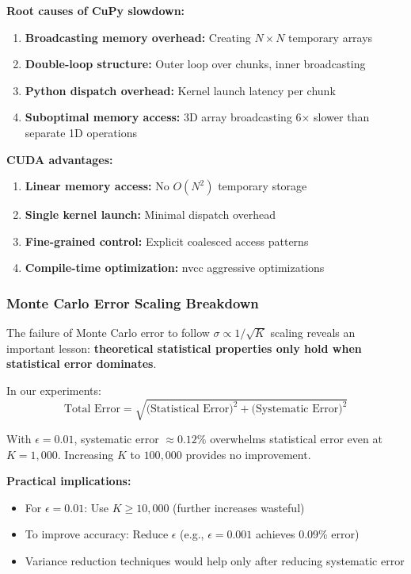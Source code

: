 \documentclass[11pt,a4paper]{article}
\begin{document}
\textbf{Root causes of CuPy slowdown:}
\begin{enumerate}
\item \textbf{Broadcasting memory overhead:} Creating $N \times N$ temporary arrays
\item \textbf{Double-loop structure:} Outer loop over chunks, inner broadcasting
\item \textbf{Python dispatch overhead:} Kernel launch latency per chunk
\item \textbf{Suboptimal memory access:} 3D array broadcasting 6× slower than separate 1D operations
\end{enumerate}

\textbf{CUDA advantages:}
\begin{enumerate}
\item \textbf{Linear memory access:} No $O(N^2)$ temporary storage
\item \textbf{Single kernel launch:} Minimal dispatch overhead
\item \textbf{Fine-grained control:} Explicit coalesced access patterns
\item \textbf{Compile-time optimization:} nvcc aggressive optimizations
\end{enumerate}

\subsubsection{Monte Carlo Error Scaling Breakdown}

The failure of Monte Carlo error to follow $\sigma \propto 1/\sqrt{K}$ scaling reveals an important lesson: \textbf{theoretical statistical properties only hold when statistical error dominates}.

In our experiments:
\begin{equation}
\text{Total Error} = \sqrt{\text{(Statistical Error)}^2 + \text{(Systematic Error)}^2}
\end{equation}

With $\epsilon=0.01$, systematic error $\approx 0.12\%$ overwhelms statistical error even at $K=1{,}000$. Increasing $K$ to $100{,}000$ provides no improvement.

\textbf{Practical implications:}
\begin{itemize}
\item For $\epsilon=0.01$: Use $K \geq 10{,}000$ (further increases wasteful)
\item To improve accuracy: Reduce $\epsilon$ (e.g., $\epsilon=0.001$ achieves 0.09\% error)
\item Variance reduction techniques would help only after reducing systematic error
\end{itemize}
\end{document}
